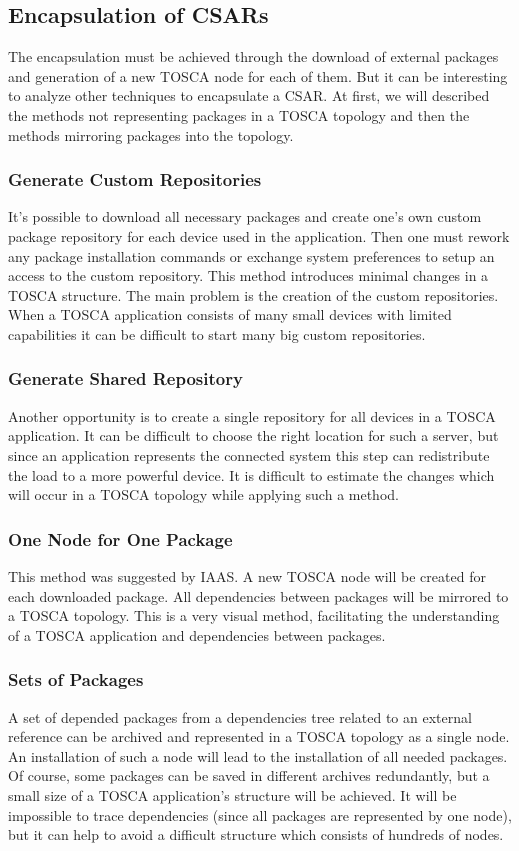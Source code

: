 \subsection*{Encapsulation of CSARs}
The encapsulation must be achieved through the download of external packages and generation of a new TOSCA node for each of them. 
But it can be interesting to analyze other techniques to encapsulate a CSAR. 
At first, we will described the methods not representing packages in a TOSCA topology and then the methods mirroring packages into the topology.\\
\subsubsection*{Generate Custom Repositories}
It's possible to download all necessary packages and create one's own custom package repository for each device used in the application. 
Then one must rework any package installation commands or exchange system preferences to setup an access to the custom repository.
This method introduces minimal changes in a TOSCA structure.
The main problem is the creation of the custom repositories. 
When a TOSCA application consists of many small devices with limited capabilities it can be difficult to start many big custom repositories.\\
\subsubsection*{Generate Shared Repository}
Another opportunity is to create a single repository for all devices in a TOSCA application.
It can be difficult to choose the right location for such a server, but since an application represents the connected system this step can redistribute the load to a more powerful device.
It is difficult to estimate the changes which will occur in a TOSCA topology while applying such a method.\\
\subsubsection*{One Node for One Package}
This method was suggested by IAAS. 
A new TOSCA node will be created for each downloaded package. 
All dependencies between packages will be mirrored to a TOSCA topology.
This is a very visual method, facilitating the understanding of a TOSCA application and dependencies between packages.\\
\subsubsection*{Sets of Packages}
A set of depended packages from a dependencies tree related to an external reference can be archived and represented in a TOSCA topology as a single node.
An installation of such a node will lead to the installation of all needed packages.
Of course, some packages can be saved in different archives redundantly, but a small size of a TOSCA application's structure will be achieved.
It will be impossible to trace dependencies (since all packages are represented by one node), but it can help to avoid a difficult structure which consists of hundreds of nodes. \\

